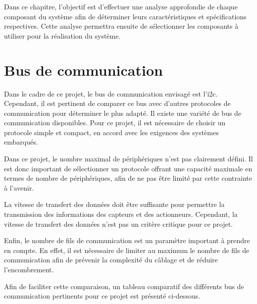 Dans ce chapitre, l'objectif est d'effectuer une analyse approfondie de chaque composant du système afin de déterminer leurs caractéristiques et spécifications respectives.
Cette analyse permettra ensuite de sélectionner les composants à utiliser pour la réalisation du système.

\section{Bus de communication}

Dans le cadre de ce projet, le bus de communication envisagé est l'\gls{i2c}.
Cependant, il est pertinent de comparer ce bus avec d'autres protocoles de communication pour déterminer le plus adapté.
Il existe une variété de bus de communication disponibles.
Pour ce projet, il est nécessaire de choisir un protocole simple et compact, en accord avec les exigences des systèmes embarqués.

Dans ce projet, le nombre maximal de périphériques n'est pas clairement défini.
Il est donc important de sélectionner un protocole offrant une capacité maximale en termes de nombre de périphériques, afin de ne pas être limité par cette contrainte à l'avenir.

La vitesse de transfert des données doit être suffisante pour permettre la transmission des informations des capteurs et des actionneurs.
Cependant, la vitesse de transfert des données n'est pas un critère critique pour ce projet.

Enfin, le nombre de fils de communication est un paramètre important à prendre en compte.
En effet, il est nécessaire de limiter au maximum le nombre de fils de communication afin de prévenir la complexité du câblage et de réduire l'encombrement.

Afin de faciliter cette comparaison, un tableau comparatif des différents bus de communication pertinents pour ce projet est présenté ci-dessous.

